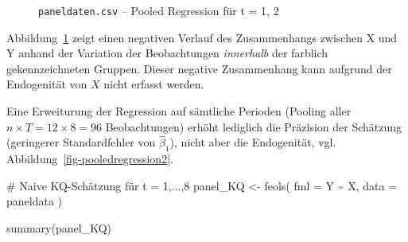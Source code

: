 \documentclass[
  a4paper,
  DIV=11,
  oneside]{scrreprt}
\newenvironment{Shaded}{\begin{snugshade}}{\end{snugshade}}
\newcommand{\AttributeTok}[1]{\textcolor[rgb]{0.40,0.45,0.13}{#1}}
\newcommand{\CommentTok}[1]{\textcolor[rgb]{0.37,0.37,0.37}{#1}}
\newcommand{\FunctionTok}[1]{\textcolor[rgb]{0.28,0.35,0.67}{#1}}
\newcommand{\NormalTok}[1]{\textcolor[rgb]{0.00,0.23,0.31}{#1}}
\newcommand{\OtherTok}[1]{\textcolor[rgb]{0.00,0.23,0.31}{#1}}
\newcommand{\SpecialCharTok}[1]{\textcolor[rgb]{0.37,0.37,0.37}{#1}}
\begin{document}
\begin{figure}[t]


\caption{\label{fig-pooledregression1}\texttt{paneldaten.csv} -- Pooled
Regression für t = 1, 2}

\end{figure}%

Abbildung~\ref{fig-pooledregression1} zeigt einen negativen Verlauf des
Zusammenhangs zwischen X und Y anhand der Variation der Beobachtungen
\emph{innerhalb} der farblich gekennzeichneten Gruppen. Dieser negative
Zusammenhang kann aufgrund der Endogenität von \(X\) nicht erfasst
werden.

Eine Erweiturung der Regression auf sämtliche Perioden (Pooling aller
\(n\times T = 12 \times 8 = 96\) Beobachtungen) erhöht lediglich die
Präzision der Schätzung (geringerer Standardfehler von
\(\widehat{\beta}_1\)), nicht aber die Endogenität, vgl.
Abbildung~\ref{fig-pooledregression2}.

\begin{Shaded}
\begin{Highlighting}[]
\CommentTok{\# Naive KQ{-}Schätzung für t = 1,...,8}
\NormalTok{panel\_KQ }\OtherTok{\textless{}{-}} \FunctionTok{feols}\NormalTok{(}
  \AttributeTok{fml =}\NormalTok{ Y }\SpecialCharTok{\textasciitilde{}}\NormalTok{ X, }
  \AttributeTok{data =}\NormalTok{ paneldata }
\NormalTok{)}

\FunctionTok{summary}\NormalTok{(panel\_KQ)}
\end{Highlighting}
\end{Shaded}
\end{document}
